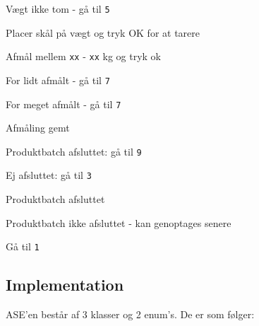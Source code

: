 \documentclass[a4paper]{article}
\newenvironment{my_enumerate}
{\begin{enumerate}
  \setlength{\itemsep}{1pt}
  \setlength{\parskip}{0pt}
  \setlength{\parsep}{0pt}}
{\end{enumerate}}
\begin{document}
\begin{my_enumerate}
\begin{my_enumerate}
      \item Vægt ikke tom - gå til \texttt{5}
    \end{my_enumerate}
  \item Placer skål på vægt og tryk OK for at tarere
  \item Afmål mellem \texttt{xx} - \texttt{xx} kg og tryk ok
    \begin{my_enumerate}
      \item For lidt afmålt - gå til \texttt{7}
      \item For meget afmålt - gå til \texttt{7}
    \end{my_enumerate}
  \item Afmåling gemt
    \begin{my_enumerate}
      \item Produktbatch afsluttet: gå til \texttt{9}
      \item Ej afsluttet: gå til \texttt{3}
    \end{my_enumerate}
  \item Produktbatch afsluttet
    \begin{my_enumerate}
      \item Produktbatch ikke afsluttet - kan genoptages senere
    \end{my_enumerate}
  \item Gå til \texttt{1}
\end{my_enumerate}




\subsection{Implementation} %

ASE'en består af 3 klasser og 2 enum's. De er som følger:
\end{document}
